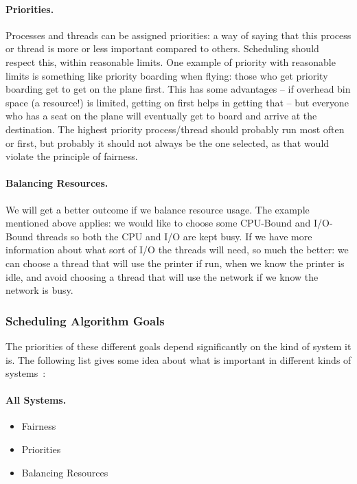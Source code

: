 \paragraph{Priorities.} Processes and threads can be assigned priorities: a way of saying that this process or thread is more or less important compared to others. Scheduling should respect this, within reasonable limits. One example of priority with reasonable limits is something like priority boarding when flying: those who get priority boarding get to get on the plane first. This has some advantages -- if overhead bin space (a resource!) is limited, getting on first helps in getting that -- but everyone who has a seat on the plane will eventually get to board and arrive at the destination.  The highest priority process/thread should probably run most often or first, but probably it should not always be the one selected, as that would violate the principle of fairness.

\paragraph{Balancing Resources.} We will get a better outcome if we balance resource usage. The example mentioned above applies: we would like to choose some CPU-Bound and I/O-Bound threads so both the CPU and I/O are kept busy. If we have more information about what sort of I/O the threads will need, so much the better: we can choose a thread that will use the printer if run, when we know the printer is idle, and avoid choosing a thread that will use the network if we know the network is busy.

\subsubsection*{Scheduling Algorithm Goals}

The priorities of these different goals depend significantly on the kind of system it is. The following list gives some idea about what is important in different kinds of systems~\cite{mos}:

\paragraph{All Systems.}
\begin{itemize}
	\item Fairness
	\item Priorities
	\item Balancing Resources
\end{itemize}

